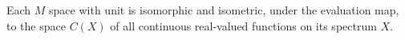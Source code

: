 Each $M$ space with unit is isomorphic and isometric, under the evaluation map, to the space $C(X)$ of all continuous real-valued functions on its spectrum $X$.
